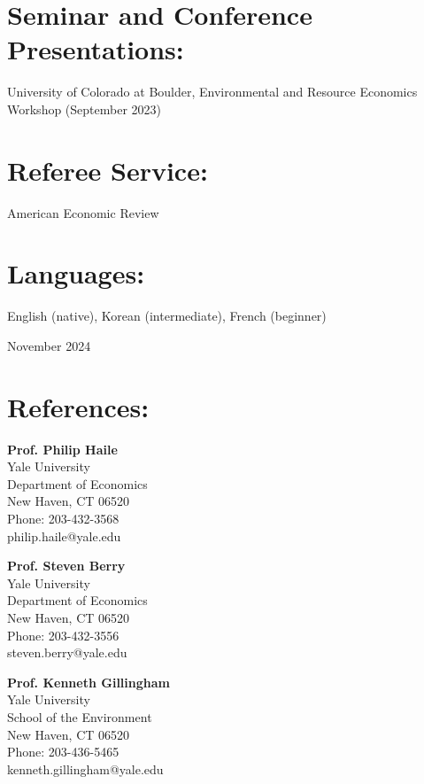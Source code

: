 \documentclass[11pt,letterpaper]{article}
\begin{document}
\section*{Seminar and Conference Presentations:}
University of Colorado at Boulder, Environmental and Resource Economics Workshop (September 2023)

\section*{Referee Service:}
American Economic Review

\section*{Languages:}
English (native), Korean (intermediate), French (beginner)

\newpage

\noindent November 2024

\section*{References:}

\noindent \textbf{Prof. Philip Haile} \\
Yale University \\
Department of Economics \\
New Haven, CT 06520 \\
Phone: 203-432-3568 \\
philip.haile@yale.edu

\vspace{0.5cm}

\noindent \textbf{Prof. Steven Berry} \\
Yale University \\
Department of Economics \\
New Haven, CT 06520 \\
Phone: 203-432-3556 \\
steven.berry@yale.edu

\vspace{0.5cm}

\noindent \textbf{Prof. Kenneth Gillingham} \\
Yale University \\
School of the Environment \\
New Haven, CT 06520 \\
Phone: 203-436-5465 \\
kenneth.gillingham@yale.edu
\end{document}
